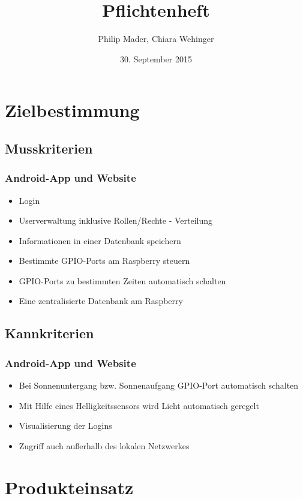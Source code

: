 \documentclass[10pt,a4paper]{report}
\author{Philip Mader, Chiara Wehinger}
\title{Pflichtenheft}
\date{30. September 2015}
\begin{document}
\maketitle
\tableofcontents
\newpage


\section{Zielbestimmung}

\subsection{Musskriterien}
\subsubsection{Android-App und Website}
\begin{itemize}
\item Login
\item Userverwaltung inklusive Rollen/Rechte - Verteilung
\item Informationen in einer Datenbank speichern
\item Bestimmte GPIO-Ports am Raspberry steuern
\item GPIO-Ports zu bestimmten Zeiten automatisch schalten
\item Eine zentralisierte Datenbank am Raspberry
\end{itemize}


\subsection{Kannkriterien}
\subsubsection{Android-App und Website}
\begin{itemize}
\item Bei Sonnenuntergang bzw. Sonnenaufgang GPIO-Port automatisch schalten
\item Mit Hilfe eines Helligkeitssensors wird Licht automatisch geregelt
\item Visualisierung der Logins 
\item Zugriff auch außerhalb des lokalen Netzwerkes
\end{itemize}

\section{Produkteinsatz}
\end{document}
